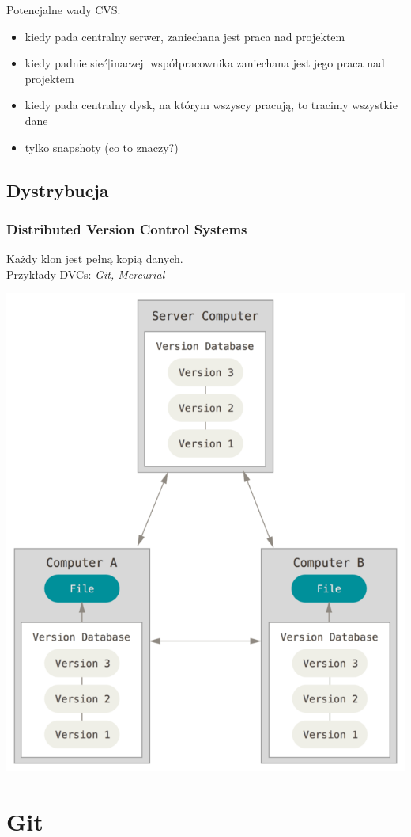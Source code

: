 \documentclass{beamer}
\begin{document}
\begin{frame}
  Potencjalne wady CVS:\@
  \begin{itemize}
  \item kiedy pada centralny serwer, zaniechana jest praca nad projektem
  \item kiedy padnie sieć[inaczej] współpracownika zaniechana jest jego praca nad projektem
  \item kiedy pada centralny dysk, na którym wszyscy pracują, to tracimy wszystkie dane 
  \item tylko snapshoty (co to znaczy?)
 \end{itemize}
\end{frame}

\subsection{Dystrybucja}
\begin{frame}
 \frametitle{\textbf{D}istributed \textbf{V}ersion \textbf{C}ontrol \textbf{S}ystems}
  Każdy klon jest pełną kopią danych.
\\
 Przykłady DVCs: \textit{Git, Mercurial}
\end{frame}

\begin{frame}
  \begin{center}
   \includegraphics[height=0.7\textwidth]{./obrazki/fig-1_3.png}
 \end{center} 
\end{frame}


\section{Git}
\end{document}
